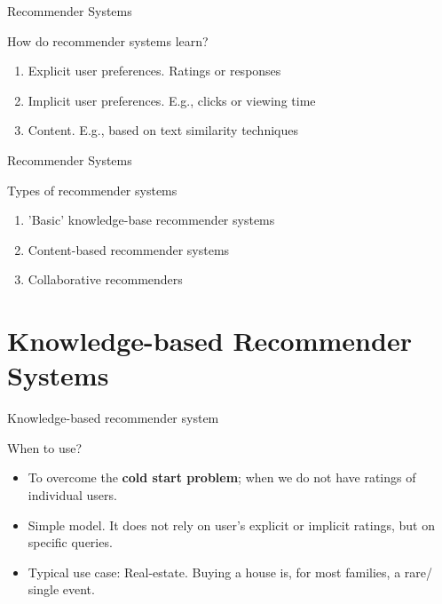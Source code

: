 \begin{frame}{Recommender Systems} 
\begin{block}{How do recommender systems learn?}
	\begin{enumerate}
		\item<2-> \alert{Explicit user preferences}. Ratings or responses 
		\item<3-> \alert{Implicit user preferences}. E.g., clicks or viewing time
		\item<3-> \alert{Content}. E.g., based on text similarity techniques
	\end{enumerate}
\end{block}
\end{frame}

\begin{frame}{Recommender Systems} 
\begin{block}{Types of recommender systems  \parencite{Wieland2021, Locherbach2018, Moller2018}}
	\begin{enumerate}
		\item 'Basic' knowledge-base recommender systems
		\item Content-based recommender systems
		\item Collaborative  recommenders 
	\end{enumerate}
\end{block}{\tiny }
\end{frame}

\section[Knowledge-based RecSys]{Knowledge-based Recommender Systems}
\begin{frame}{Knowledge-based recommender system} 
\begin{block}{When to use?}
	\begin{itemize}
		\item<2-> To overcome the \textbf{cold start problem}; when we do not have ratings of individual users. 
		\item<3-> Simple model. It does not rely on user's explicit or implicit ratings, but on specific queries.
		\item<4-> Typical use case: Real-estate. Buying a house is, for most families, a rare/ single event. 
	\end{itemize}
\end{block}
\end{frame}


